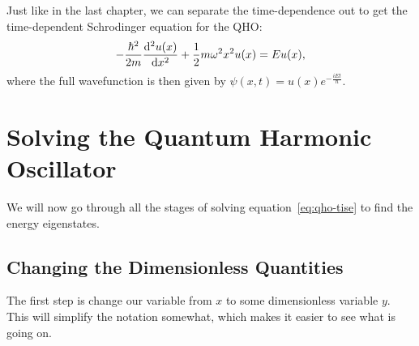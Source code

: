 \documentclass[../quantum_mechanics.tex]{subfiles}
\begin{document}
            Just like in the last chapter, we can separate the time-dependence out to get the time-dependent Schrodinger equation for the QHO:
            \begin{equation}\label{eq:qho-tise}
                -\frac{\hbar^2}{2m}\dv[2]{u(x)}{x}+\frac{1}{2}m\omega^2x^2u(x)=Eu(x),
            \end{equation}
            where the full wavefunction is then given by $\psi(x,t)=u(x)e^{-\frac{iEt}{\hbar}}$.

    \section{Solving the Quantum Harmonic Oscillator}\label{sec:solving-the-quantum-harmonic-oscillator}
        We will now go through all the stages of solving equation~\ref{eq:qho-tise} to find the energy eigenstates.
        
        \subsection{Changing the Dimensionless Quantities}\label{sec:solving-the-quantum-harmonic-oscillator:subsec:changing-to-dimensionless-quantities}
            The first step is change our variable from $x$ to some dimensionless variable $y$.
            This will simplify the notation somewhat, which makes it easier to see what is going on.
\end{document}
